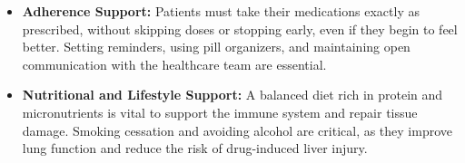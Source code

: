 \begin{itemize}
\begin{itemize}
        \item \textbf{Cough Etiquette:} Always cover the mouth and nose with a tissue when coughing, sneezing, or laughing, and dispose of the tissue immediately in a closed bin. Alternatively, cough or sneeze into the inner elbow.
        \item \textbf{Ventilation:} Keep windows open as much as possible to allow fresh air to circulate and dilute any infectious aerosols. Avoid sleeping in the same room as uninfected family members.
        \item \textbf{Avoid Public Spaces:} Do not go to work, school, or use public transport until cleared by a physician or public health authority.
    \end{itemize}
    \item \textbf{Adherence Support:} Patients must take their medications exactly as prescribed, without skipping doses or stopping early, even if they begin to feel better. Setting reminders, using pill organizers, and maintaining open communication with the healthcare team are essential.
    \item \textbf{Nutritional and Lifestyle Support:} A balanced diet rich in protein and micronutrients is vital to support the immune system and repair tissue damage. Smoking cessation and avoiding alcohol are critical, as they improve lung function and reduce the risk of drug-induced liver injury.
\end{itemize}

